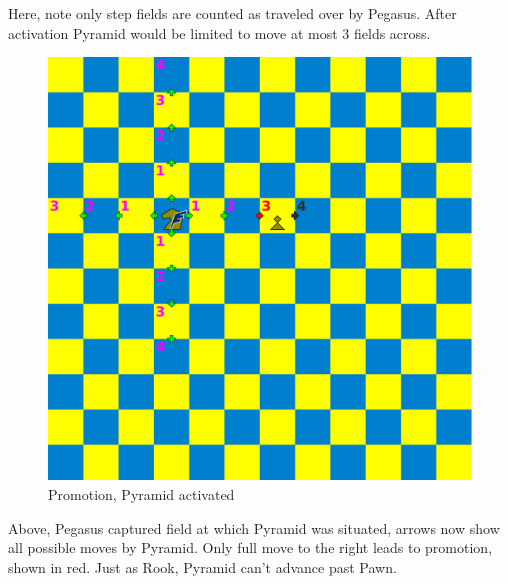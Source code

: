 \documentclass[a5paper,12pt,draft]{book} %
\begin{document}
Here, note only step fields are counted as traveled over by Pegasus. After
activation Pyramid would be limited to move at most 3 fields across.

\clearpage

\noindent
\begin{figure}[!h]
\includegraphics[width=1.0\textwidth, keepaspectratio=true]{../gfx/examples/05_move_pyramid_promo_activate.png}
\caption{Promotion, Pyramid activated}
\label{fig:ma_promo_activate}
\end{figure}

Above, Pegasus captured field at which Pyramid was situated, arrows now show
all possible moves by Pyramid. Only full move to the right leads to promotion,
shown in red. Just as Rook, Pyramid can't advance past Pawn.

\clearpage
\end{document}
